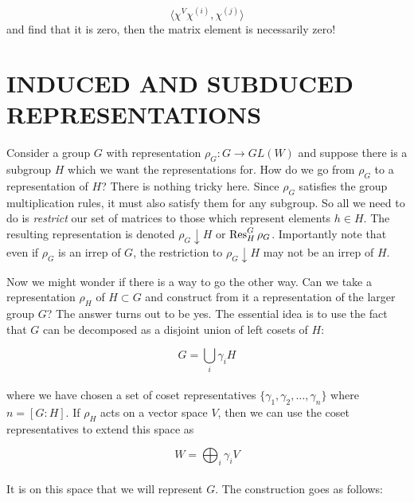 \documentclass[9 pt]{report}
\begin{document}
$$ \langle \chi^{V}\chi^{(i)}, \chi^{(j)}\rangle $$
and find that it is zero, then the matrix element is necessarily zero!



\newpage


{\centering
\section*{INDUCED AND SUBDUCED REPRESENTATIONS}}
Consider a group $G$ with representation $\rho_{G}: G\to GL(W)$ and suppose there is a subgroup $H$ which we want the representations for. How do we go from $\rho_{G}$ to a representation of $H$? There is nothing tricky here. Since $\rho_G$ satisfies the group multiplication rules, it must also satisfy them for any subgroup. So all we need to do is \emph{restrict} our set of matrices to those which represent elements $h\in H$. The resulting representation is denoted $\rho_G \downarrow H$ or $\Res_H^G\rho_G$. Importantly note that even if $\rho_G$ is an irrep of $G$, the restriction to $\rho_G\downarrow H$ may not be an irrep of $H$. 

Now we might wonder if there is a way to go the other way. Can we take a representation $\rho_H$ of $H\subset G$ and construct from it a representation of the larger group $G$? The answer turns out to be yes. The essential idea is to use the fact that $G$ can be decomposed as a disjoint union of left cosets of $H$:

$$ G = \bigcup_i \gamma_iH $$
\\
where we have chosen a set of coset representatives $\{\gamma_1, \gamma_2, \dots , \gamma_n\}$ where $n=[G:H]$. If $\rho_H$ acts on a vector space $V$, then we can use the coset representatives to extend this space as

$$ W = \bigoplus_i \gamma_iV $$
\\
It is on this space that we will represent $G$. The construction goes as follows:
\end{document}
